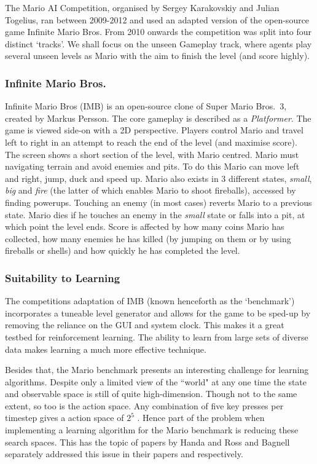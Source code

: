 The Mario AI Competition, organised by Sergey Karakovskiy and Julian Togelius, ran between 2009-2012 and used an adapted version of the open-source game Infinite Mario Bros. From 2010 onwards the competition was split into four distinct `tracks'. We shall focus on the unseen Gameplay track, where agents play several unseen levels as Mario with the aim to finish the level (and score highly). \cite{marioaicomp} \cite{2012the}

\subsubsection*{\hspace{6pt}Infinite Mario Bros.}

Infinite Mario Bros (IMB) \cite{imb} is an open-source clone of Super Mario Bros.~3, created by Markus Persson. The core gameplay is described as a \emph{Platformer}. The game is viewed side-on with a 2D perspective. Players control Mario and travel left to right in an attempt to reach the end of the level (and maximise score). The screen shows a short section of the level, with Mario centred. Mario must navigating terrain and avoid enemies and pits. To do this Mario can move left and right, jump, duck and speed up. Mario also exists in 3 different states, \emph{small}, \emph{big} and \emph{fire} (the latter of which enables Mario to shoot fireballs), accessed by finding powerups. Touching an enemy (in most cases) reverts Mario to a previous state. Mario dies if he touches an enemy in the \emph{small} state or falls into a pit, at which point the level ends. Score is affected by how many coins Mario has collected, how many enemies he has killed (by jumping on them or by using fireballs or shells) and how quickly he has completed the level. \cite[p.~3]{2012the}

\subsubsection*{\hspace{6pt}Suitability to Learning}

The competitions adaptation of IMB (known henceforth as the `benchmark') incorporates a tuneable level generator and allows for the game to be sped-up by removing the reliance on the GUI and system clock. This makes it a great testbed for reinforcement learning. The ability to learn from large sets of diverse data makes learning a much more effective technique. \cite[p.~3]{2012the}

Besides that, the Mario benchmark presents an interesting challenge for learning algorithms. Despite only a limited view of the ``world" at any one time the state and observable space is still of quite high-dimension. Though not to the same extent, so too is the action space. Any combination of five key presses per timestep gives a action space of $2^5$ \cite[p.~3]{2012the}. Hence part of the problem when implementing a learning algorithm for the Mario benchmark is reducing these search spaces. This has the topic of papers by Handa and Ross and Bagnell \cite{rossbagnell} separately addressed this issue in their papers \cite{handa} and \cite{rossbagnell} respectively.


